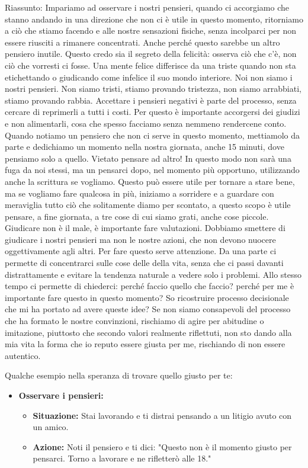 \documentclass[12pt]{book} %
\begin{document}
\begin{mdframed}[linewidth=1pt]
Riassunto: Impariamo ad osservare i nostri pensieri, quando ci accorgiamo che stanno andando in una direzione che non ci è utile in questo momento, ritorniamo a ciò che stiamo facendo e alle nostre sensazioni fisiche, senza incolparci per non essere riusciti a rimanere concentrati. Anche perché questo sarebbe un altro pensiero inutile. Questo credo sia il segreto della felicità: osserva ciò che c'è, non ciò che vorresti ci fosse. Una mente felice differisce da una triste quando non sta etichettando o giudicando come infelice il suo mondo interiore. Noi non siamo i nostri pensieri. Non siamo tristi, stiamo provando tristezza, non siamo arrabbiati, stiamo provando rabbia. Accettare i pensieri negativi è parte del processo, senza cercare di reprimerli a tutti i costi. Per questo è importante accorgersi dei giudizi e non alimentarli, cosa che spesso facciamo senza nemmeno rendercene conto.
Quando notiamo un pensiero che non ci serve in questo momento, mettiamolo da parte e dedichiamo un momento nella nostra giornata, anche 15 minuti, dove pensiamo solo a quello. Vietato pensare ad altro! In questo modo non sarà una fuga da noi stessi, ma un pensarci dopo, nel momento più opportuno, utilizzando anche la scrittura se vogliamo. Questo può essere utile per tornare a stare bene, ma se vogliamo fare qualcosa in più, iniziamo a sorridere e a guardare con meraviglia tutto ciò che solitamente diamo per scontato, a questo scopo è utile pensare, a fine giornata, a tre cose di cui siamo grati, anche cose piccole.
Giudicare non è il male, è importante fare valutazioni. Dobbiamo smettere di giudicare i nostri pensieri ma non le nostre azioni, che non devono nuocere oggettivamente agli altri.
Per fare questo serve attenzione. Da una parte ci permette di concentrarci sulle cose delle della vita, senza che ci passi davanti distrattamente e evitare la tendenza naturale a vedere solo i problemi. Allo stesso tempo ci permette di chiederci: perché faccio quello che faccio? perché per me è importante fare questo in questo momento? So ricostruire processo decisionale che mi ha portato ad avere queste idee? Se non siamo consapevoli del processo che ha formato le nostre convinzioni, rischiamo di agire per abitudine o imitazione, piuttosto che secondo valori realmente riflettuti, non sto dando alla mia vita la forma che io reputo essere giusta per me, rischiando di non essere autentico.

Qualche esempio nella speranza di trovare quello giusto per te:
\begin{itemize}
    \item \textbf{Osservare i pensieri:} 
    \begin{itemize}
        \item \textbf{Situazione:} Stai lavorando e ti distrai pensando a un litigio avuto con un amico.
        \item \textbf{Azione:} Noti il pensiero e ti dici: "Questo non è il momento giusto per pensarci. Torno a lavorare e ne rifletterò alle 18."
    \end{itemize}


\end{itemize}
\end{mdframed}
\end{document}
